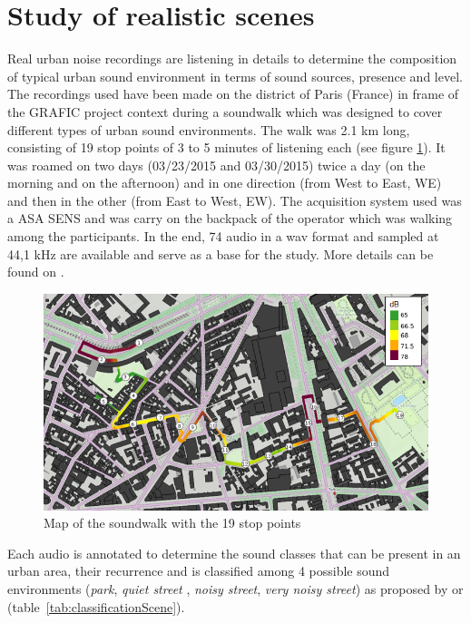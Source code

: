 \documentclass[a4,11pt,twocolumn]{article}
\begin{document}
\section{Study of realistic scenes}
Real urban noise recordings are listening in details to determine the composition of typical urban sound environment in terms of sound sources, presence and level. The recordings used have been made on the  district of Paris (France) in frame of the GRAFIC project context \cite{aumond_sound_2016} during a soundwalk which was designed to cover different types of urban sound environments. The walk was 2.1 km long, consisting of 19 stop points of 3 to 5 minutes of listening each (see figure \ref{fig:soundwalk}). It was roamed on two days (03/23/2015 and 03/30/2015) twice a day (on the morning and on the afternoon) and in one direction (from West to East, WE) and then in the other (from East to West, EW). The acquisition system used was a ASA SENS and was carry on the backpack of the operator which was walking among the participants. In the end, 74 audio in a wav format and sampled at 44,1 kHz are available and serve as a base for the study. More details can be found on  \cite{aumond_modelling_2017}. \\

\begin{figure}[H]
\centering
\includegraphics[width=.5\textwidth]{./pictures/trajet_19pts.png}
\caption{Map of the soundwalk with the 19 stop points}
\label{fig:soundwalk}
\end{figure}


Each audio is annotated to determine the sound classes that can be present in an urban area, their recurrence and is classified among 4 possible sound environments (\textit{park}, \textit{quiet street} , \textit{noisy street}, \textit{very noisy street}) as proposed by \cite{rychtarikova_soundscape_2013} or \cite{can_describing_2015} (table~\ref{tab:classificationScene}).
\end{document}
